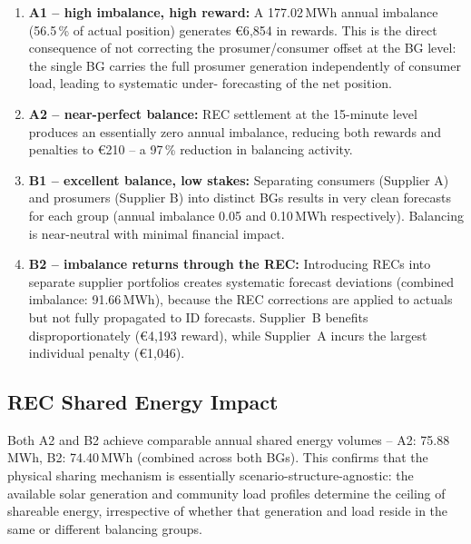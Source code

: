 \begin{enumerate}
    \item \textbf{A1 -- high imbalance, high reward:}  A 177.02\,MWh annual
          imbalance (56.5\,\% of actual position) generates €6{,}854 in rewards.
          This is the direct consequence of not correcting the prosumer/consumer
          offset at the BG level: the single BG carries the full prosumer
          generation independently of consumer load, leading to systematic under-
          forecasting of the net position.

    \item \textbf{A2 -- near-perfect balance:}  REC settlement at the 15-minute
          level produces an essentially zero annual imbalance, reducing both
          rewards and penalties to €210 -- a 97\,\% reduction in balancing
          activity.

    \item \textbf{B1 -- excellent balance, low stakes:}  Separating consumers
          (Supplier A) and prosumers (Supplier B) into distinct BGs results in
          very clean forecasts for each group (annual imbalance 0.05 and 0.10\,MWh
          respectively).  Balancing is near-neutral with minimal financial impact.

    \item \textbf{B2 -- imbalance returns through the REC:}  Introducing RECs
          into separate supplier portfolios creates systematic forecast deviations
          (combined imbalance: 91.66\,MWh), because the REC corrections are
          applied to actuals but not fully propagated to ID forecasts.  Supplier~B
          benefits disproportionately (€4{,}193 reward), while Supplier~A incurs
          the largest individual penalty (€1{,}046).
\end{enumerate}

\subsection{REC Shared Energy Impact}

Both A2 and B2 achieve comparable annual shared energy volumes -- A2:
75.88\,MWh, B2: 74.40\,MWh (combined across both BGs).  This confirms that the
physical sharing mechanism is essentially scenario-structure-agnostic: the
available solar generation and community load profiles determine the ceiling of
shareable energy, irrespective of whether that generation and load reside in
the same or different balancing groups.

